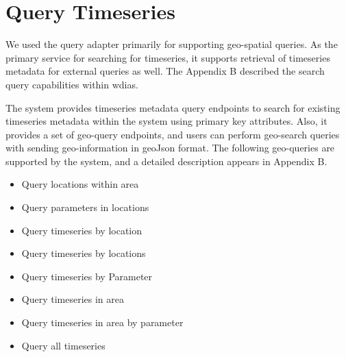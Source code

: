 \section{Query Timeseries}
\label{se:query}

We used the query adapter primarily for supporting geo-spatial queries. As the primary service for searching for timeseries, it supports retrieval of timeseries metadata for external queries as well. The Appendix B described the search query capabilities within \acrshort{wdias}.

The system provides timeseries metadata query endpoints to search for existing timeseries metadata within the system using primary key attributes.
Also, it provides a set of geo-query endpoints, and users can perform geo-search queries with sending geo-information in geoJson format. The following geo-queries are supported by the system, and a detailed description appears in Appendix B.
\begin{itemize}
    \item Query locations within area
    \item Query parameters in locations
    \item Query timeseries by location
    \item Query timeseries by locations
    \item Query timeseries by Parameter
    \item Query timeseries in area
    \item Query timeseries in area by parameter
    \item Query all timeseries
\end{itemize}

